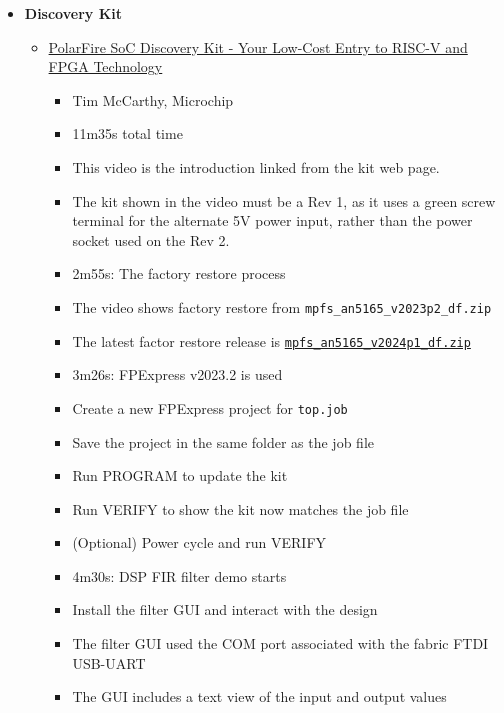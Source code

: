 \begin{itemize}
\item \textbf{Discovery Kit}
%
\begin{itemize}
\item
\href{https://www.youtube.com/watch?v=GmitNBnw22I}
{PolarFire SoC Discovery Kit - Your Low-Cost Entry to RISC-V and FPGA Technology}
\begin{itemize}
\item
Tim McCarthy, Microchip
\item
11m35s total time
\item
This video is the introduction linked from the kit web page.
\item The kit shown in the video must be a Rev 1, as it uses a green screw
terminal for the alternate 5V power input, rather than the power socket used
on the Rev 2.
\item 2m55s: The factory restore process
\item The video shows factory restore from \verb+mpfs_an5165_v2023p2_df.zip+
\item The latest factor restore release is
\href{https://ww1.microchip.com/downloads/aemDocuments/documents/FPGA/SOCDesignFiles/mpfs_an5165_v2024p1_df.zip}
{\texttt{mpfs\_an5165\_v2024p1\_df.zip}}
\item 3m26s: FPExpress v2023.2 is used
\item Create a new FPExpress project for \verb+top.job+
\item Save the project in the same folder as the job file
\item Run PROGRAM to update the kit
\item Run VERIFY to show the kit now matches the job file
\item (Optional) Power cycle and run VERIFY
\item 4m30s: DSP FIR filter demo starts
\item Install the filter GUI and interact with the design
\item The filter GUI used the COM port associated with the fabric FTDI USB-UART
\item The GUI includes a text view of the input and output values
\end{itemize}


\end{itemize}
\end{itemize}
